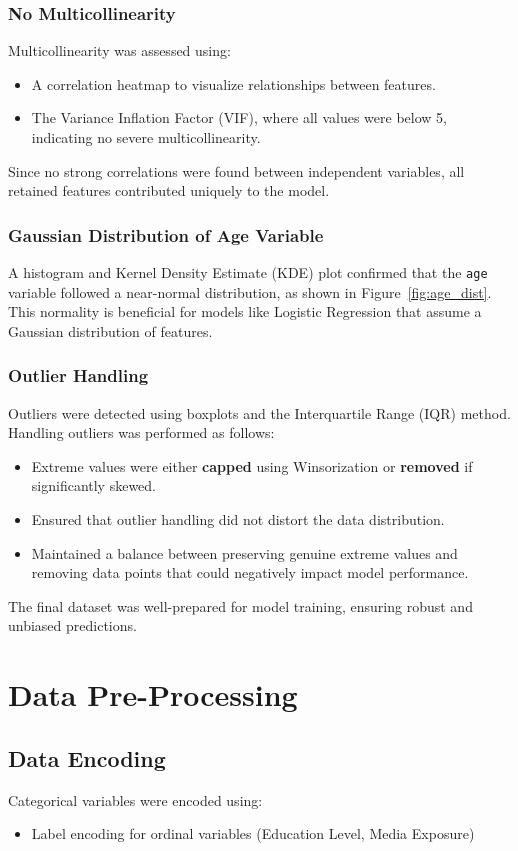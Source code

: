 \documentclass[12pt]{article}
\begin{document}
\subsubsection{No Multicollinearity}
Multicollinearity was assessed using:
\begin{itemize}
    \item A correlation heatmap to visualize relationships between features.
    \item The Variance Inflation Factor (VIF), where all values were below 5, indicating no severe multicollinearity.
\end{itemize}
Since no strong correlations were found between independent variables, all retained features contributed uniquely to the model.

\subsubsection{Gaussian Distribution of Age Variable}
A histogram and Kernel Density Estimate (KDE) plot confirmed that the \texttt{age} variable followed a near-normal distribution, as shown in Figure~\ref{fig:age_dist}. This normality is beneficial for models like Logistic Regression that assume a Gaussian distribution of features.


\subsubsection{Outlier Handling}
Outliers were detected using boxplots and the Interquartile Range (IQR) method. Handling outliers was performed as follows:
\begin{itemize}
    \item Extreme values were either \textbf{capped} using Winsorization or \textbf{removed} if significantly skewed.
    \item Ensured that outlier handling did not distort the data distribution.
    \item Maintained a balance between preserving genuine extreme values and removing data points that could negatively impact model performance.
\end{itemize}
The final dataset was well-prepared for model training, ensuring robust and unbiased predictions.

\section{Data Pre-Processing}

\subsection{Data Encoding}
Categorical variables were encoded using:
\begin{itemize}
    \item Label encoding for ordinal variables (Education Level, Media Exposure)
\end{itemize}
\end{document}
